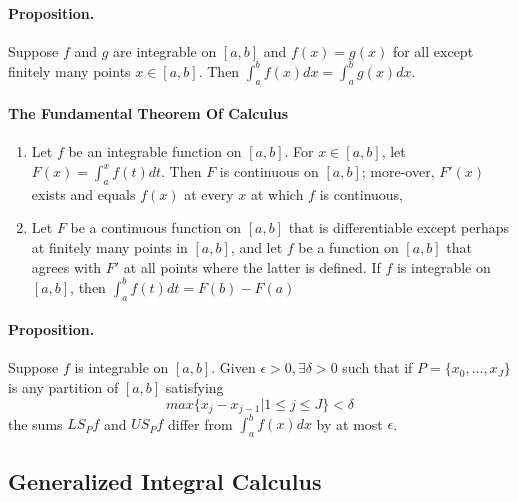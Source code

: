\documentclass[11pt]{article}
\begin{document}
\paragraph{Proposition.} Suppose $f$ and $g$ are integrable on $[a,b]$ and $f(x) = g(x)$ for all except finitely many points $x\in [a,b]$. Then $\int_a^bf(x)dx = \int_a^bg(x)dx$. 

\paragraph{The Fundamental Theorem Of Calculus}
\begin{enumerate}
    \item Let $f$ be an integrable function on $[a,b]$. For $x\in [a,b]$, let $F(x) = \int_a^xf(t)dt$. Then $F$ is continuous on $[a,b]$; more-over, $F'(x)$ exists and equals $f(x)$ at every $x$ at which $f$ is continuous,
    \item Let $F$ be a continuous function on $[a,b]$ that is differentiable except perhaps at finitely many points in $[a,b]$, and let $f$ be a function on $[a,b]$ that agrees with $F'$ at all points where the latter is defined. If $f$ is integrable on $[a,b]$, then $\int_a^bf(t)dt=F(b)-F(a)$
\end{enumerate}

\paragraph{Proposition.} Suppose $f$ is integrable on $[a,b]$. Given $\epsilon>0, \exists \delta > 0$ such that if $P= \{x_0,...,x_J\}$ is any partition of $[a,b]$ satisfying
\begin{equation*}
    max\{x_j-x_{j-1} | 1\leq j \leq J\} < \delta
\end{equation*}
the sums $LS_Pf$ and $US_Pf$ differ from $\int_a^bf(x)dx$ by at most $\epsilon$.

\subsection{Generalized Integral Calculus}
\end{document}
